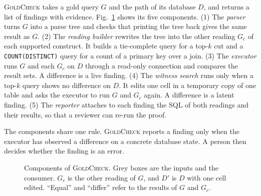 \documentclass[conference]{IEEEtran}
\newcommand{\sys}{\textsc{GoldCheck}}
\begin{document}
\sys{} takes a gold query $G$ and the path of its database $D$, and returns a
list of findings with evidence. Fig.~\ref{fig:overview} shows its five
components. (1) The \emph{parser} turns $G$ into a parse tree and checks that
printing the tree back gives the same result as $G$. (2) The \emph{reading
builder} rewrites the tree into the other reading $G_c$ of each supported
construct. It builds a tie-complete query for a top-$k$ cut and a
\texttt{COUNT(DISTINCT)} query for a count of a primary key over a join. (3)
The \emph{executor} runs $G$ and each $G_c$ on $D$ through a read-only
connection and compares the result sets. A difference is a live finding. (4)
The \emph{witness search} runs only when a top-$k$ query shows no difference on
$D$. It edits one cell in a temporary copy of one table and asks the executor to
run $G$ and $G_c$ again. A difference is a latent finding. (5) The
\emph{reporter} attaches to each finding the SQL of both readings and their
results, so that a reviewer can re-run the proof.

The components share one rule. \sys{} reports a finding only when the executor
has observed a difference on a concrete database state. A person then decides
whether the finding is an error.

\begin{figure}[t]
\centering
{}
\caption{Components of \sys{}. Grey boxes are the inputs and the consumer.
$G_c$ is the other reading of $G$, and $D'$ is $D$ with one cell edited.
``Equal'' and ``differ'' refer to the results of $G$ and $G_c$.}
\label{fig:overview}
\end{figure}
\end{document}
